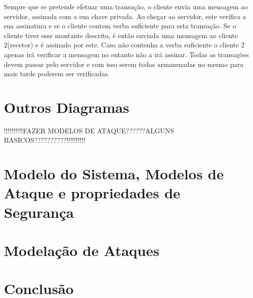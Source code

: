 Sempre que se pretende efetuar uma transação, o cliente envia uma mensagem ao servidor, assinada com a sua chave privada. Ao chegar ao servidor, este verifica a sua assinatura e se o cliente contem verba suficiente para esta transação. Se o cliente tiver esse montante descrito, é então enviada uma mensagem ao cliente 2(recetor) e é assinado por este. Caso não contenha a verba suficiente o cliente 2 apenas irá verificar a mensagem no entanto não a irá assinar. 
Todas as transações devem passar pelo servidor e com isso serem todas armazenadas no mesmo para mais tarde poderem ser verificadas.


\section{Outros Diagramas}
\label{sec:diagramas}


!!!!!!!!!!FAZER MODELOS DE ATAQUE??????ALGUNS BASICOS??????????!!!!!!!!!!

\section{Modelo do Sistema, Modelos de Ataque e propriedades de Segurança}
\label{sec:modelos}

\section{Modelação de Ataques}
\label{sec:ataques}

\section{Conclusão}
\label{sec:conclusao}

